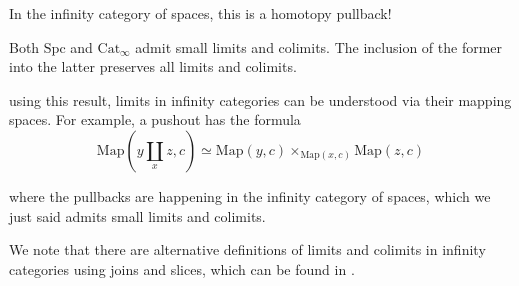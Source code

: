 In the infinity category of spaces, this is a homotopy pullback!

\begin{proposition}{}{}
    Both $\mathrm{Spc}$ and $\mathrm{Cat}_\infty$ admit small limits and colimits. The inclusion of the former into the latter preserves all limits and colimits.
    
\end{proposition}

using this result, limits in infinity categories can be understood via their mapping spaces. For example, a pushout has the formula $$\mathrm{Map}(y\coprod_x z,c)\simeq \mathrm{Map}(y,c)\times_{\mathrm{Map}(x,c)} \mathrm{Map}(z,c)$$

where the pullbacks are happening in the infinity category of spaces, which we just said admits small limits and colimits.

We note that there are alternative definitions of limits and colimits in infinity categories using joins and slices, which can be found in \cite*{land_introduction_2021}.






